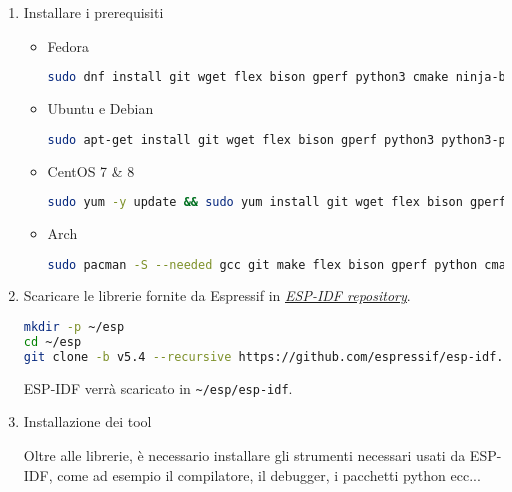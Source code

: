 \documentclass[a4paper]{article}
\begin{document}
\begin{enumerate}
  \item Installare i prerequisiti
    \begin{itemize}
      \item Fedora

\begin{lstlisting}[language=Bash]
sudo dnf install git wget flex bison gperf python3 cmake ninja-build ccache dfu-util libusbx
\end{lstlisting}

      \item Ubuntu e Debian

\begin{lstlisting}[language=Bash]
sudo apt-get install git wget flex bison gperf python3 python3-pip python3-venv cmake ninja-build ccache libffi-dev libssl-dev dfu-util libusb-1.0-0
\end{lstlisting}

      \item CentOS 7 \& 8

\begin{lstlisting}[language=Bash]
sudo yum -y update && sudo yum install git wget flex bison gperf python3 cmake ninja-build ccache dfu-util libusbx
\end{lstlisting}

      \item Arch

\begin{lstlisting}[language=Bash]
sudo pacman -S --needed gcc git make flex bison gperf python cmake ninja ccache dfu-util libusb
\end{lstlisting}

    \end{itemize}

  \item Scaricare le librerie fornite da Espressif in 
    \href{https://github.com/espressif/esp-idf}{\textit{\underline{ESP-IDF repository}}}.

\begin{lstlisting}[language=Bash]
mkdir -p ~/esp
cd ~/esp
git clone -b v5.4 --recursive https://github.com/espressif/esp-idf.git
\end{lstlisting}

    ESP-IDF verrà scaricato in \lstinline{~/esp/esp-idf}.

  \item Installazione dei tool

    \vspace{1em}
    \noindent
    Oltre alle librerie, è necessario installare gli strumenti necessari usati da ESP-IDF,
    come ad esempio il compilatore, il debugger, i pacchetti python ecc...


\end{enumerate}
\end{document}
